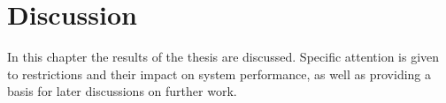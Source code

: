 \chapter{Discussion}
\label{cha:discussion}
    In this chapter the results of the thesis are discussed.
    Specific attention is given to restrictions and their impact on
    system performance, as well as providing a basis for later discussions
    on further work.

    
